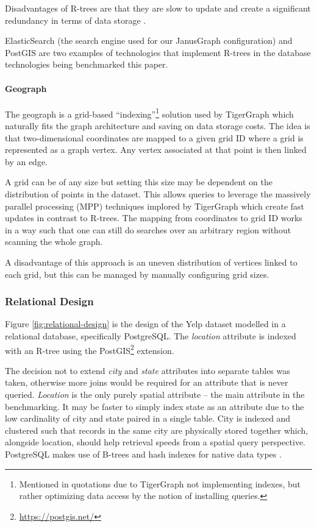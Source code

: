 Disadvantages of R-trees are that they are slow to update and create a significant redundancy in terms of data storage \cite{graphgurus}.

ElasticSearch (the search engine used for our JanusGraph configuration) and PostGIS are two examples of technologies that implement R-trees in the database technologies being benchmarked this paper.

\paragraph{Geograph}

The geograph is a grid-based ``indexing''\footnote{Mentioned in quotations due to TigerGraph not implementing indexes, but rather optimizing data access by the notion of installing queries.} solution used by TigerGraph which naturally fits the graph architecture and saving on data storage costs. The idea is that two-dimensional coordinates are mapped to a given grid ID where a grid is represented as a graph vertex. Any vertex associated at that point is then linked by an edge.

A grid can be of any size but setting this size may be dependent on the distribution of points in the dataset. This allows queries to leverage the massively parallel processing (MPP) techniques implored by TigerGraph which create fast updates in contrast to R-trees. The mapping from coordinates to grid ID works in a way such that one can still do searches over an arbitrary region without scanning the whole graph.

A disadvantage of this approach is an uneven distribution of vertices linked to each grid, but this can be managed by manually configuring grid sizes.

\subsubsection{Relational Design}
\label{subsub:relational-design}

Figure \ref{fig:relational-design} is the design of the Yelp dataset modelled in a relational database, specifically PostgreSQL. The \emph{location} attribute is indexed with an R-tree using the PostGIS\footnote{\url{https://postgis.net/}} extension.

The decision not to extend \emph{city} and \emph{state} attributes into separate tables was taken, otherwise more joins would be required for an attribute that is never queried. \emph{Location} is the only purely spatial attribute -- the main attribute in the benchmarking. It may be faster to simply index state as an attribute due to the low cardinality of city and state paired in a single table. City is indexed and clustered such that records in the same city are physically stored together which, alongside location, should help retrieval speeds from a spatial query perspective. PostgreSQL makes use of B-trees and hash indexes for native data types \cite{post-vs-mysql}.

